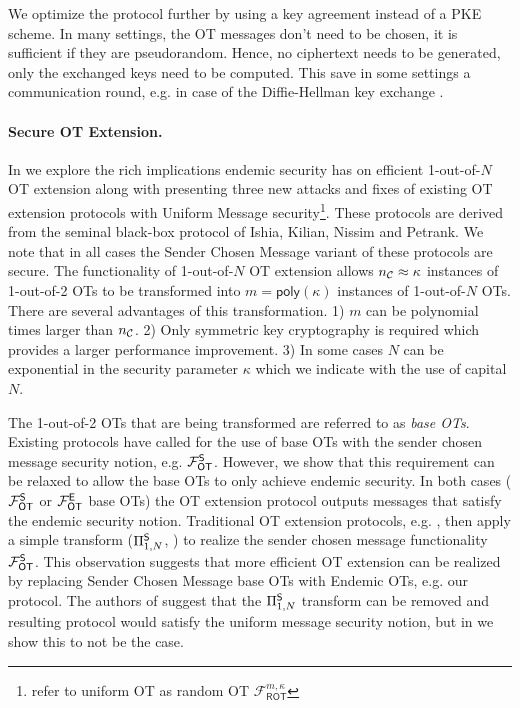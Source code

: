 We optimize the protocol further by using a key agreement instead of a PKE scheme. In many settings, the OT messages don't need to be chosen, it is sufficient if they are pseudorandom. Hence, no ciphertext needs to be generated, only the exchanged keys need to be computed. This save in some settings a communication round, e.g. in case of the Diffie-Hellman key exchange \cite{DifHel76}.

\paragraph{Secure OT Extension.} 
In  we explore the rich implications endemic security has on efficient 1-out-of-$N$ OT extension along with presenting three new attacks and fixes of existing OT extension protocols\cite{C:KelOrsSch15,RSA:OrrOrsSch17} with Uniform Message security\footnote{\cite{C:KelOrsSch15,RSA:OrrOrsSch17} refer to uniform OT as random OT $\mathcal{F}^{m,\kappa}_{\textsf{ROT}}$}. 
\iffullversion
These protocols are derived from the seminal black-box protocol of Ishia, Kilian, Nissim and Petrank\cite{C:IKNP03}. We note that in all cases the Sender Chosen Message variant of these protocols\cite{C:IKNP03,C:KelOrsSch15,RSA:OrrOrsSch17} are secure. 
\fi
The functionality of 1-out-of-$N$ OT extension allows ${n_\mathcal{C}}\approx\kappa$ instances of 1-out-of-2 OTs to be transformed into $m=\textsf{poly}(\kappa)$ instances of 1-out-of-$N$ OTs. There are several advantages of this transformation. 1) $m$ can be polynomial times larger than ${n_\mathcal{C}}$. 2) Only symmetric key cryptography is required which provides a larger performance improvement. 3) In some cases $N$ can be exponential in the security parameter $\kappa$ which we indicate with the use of capital $N$. 

The 1-out-of-2 OTs that are being transformed are referred to as \emph{base OTs}. Existing protocols \cite{C:IKNP03,EC:ALSZ15,C:KelOrsSch15,RSA:OrrOrsSch17} have called for the use of base OTs with the sender chosen message security notion, e.g. $\mathcal{F}_{\mathsf{OT}}^\mathsf{S}$. However, we show that this requirement can be relaxed to allow the base OTs to only achieve endemic security. In both cases ($\mathcal{F}_{\mathsf{OT}}^\mathsf{S}$ or $\mathcal{F}_{\mathsf{OT}}^\mathsf{E}$ base OTs) the OT extension protocol outputs messages that satisfy the endemic security notion.  Traditional OT extension protocols, e.g. \cite{C:IKNP03,EC:ALSZ15,C:KelOrsSch15}, then apply a simple transform ($\Pi^{\mathsf{S}}_{1,N}$, ) to realize the sender chosen message functionality $\mathcal{F}_{\mathsf{OT}}^\mathsf{S}$.
\iffullversion
 This observation suggests that more efficient OT extension can be realized by replacing Sender Chosen Message base OTs with Endemic OTs, e.g. our protocol.
\fi
The authors of \cite{C:KelOrsSch15,RSA:OrrOrsSch17} suggest that the $\Pi^{\mathsf{S}}_{1,N}$ transform  can be removed and resulting protocol would satisfy the uniform message security notion, but in   we show this to not be the case. 


